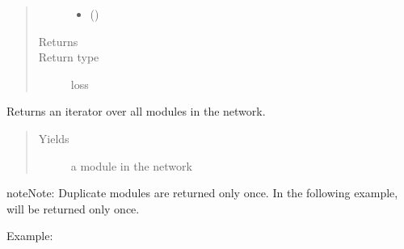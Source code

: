 \documentclass[letterpaper,10pt,english]{sphinxmanual}
\begin{document}
\begin{fulllineitems}
\begin{fulllineitems}
\begin{quote}
\begin{description}
\begin{itemize}
\item {} 
 () \textendash{} 

\end{itemize}

\item[{Returns}] \leavevmode


\item[{Return type}] \leavevmode
loss

\end{description}\end{quote}

\end{fulllineitems}


\begin{fulllineitems}
\label{\detokenize{api/autoencoding:geology.metamodelling.SpatialAutoencoder.modules}}
Returns an iterator over all modules in the network.
\begin{quote}\begin{description}
\item[{Yields}] \leavevmode
{} \textendash{} a module in the network

\end{description}\end{quote}

\begin{sphinxadmonition}{note}{Note:}
Duplicate modules are returned only once. In the following
example,  will be returned only once.
\end{sphinxadmonition}

Example:

\begin{sphinxVerbatim}[commandchars=\\\{\}]
   
   
    


\end{sphinxVerbatim}
\end{fulllineitems}
\end{fulllineitems}
\end{document}
